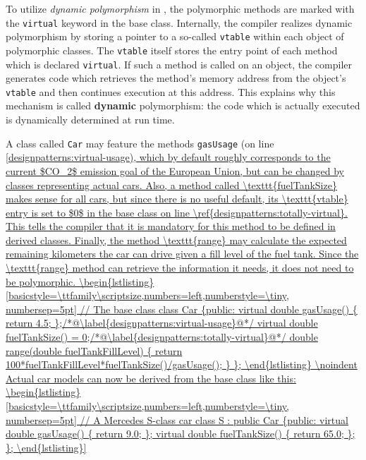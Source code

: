 To utilize \textit{dynamic polymorphism} in \Cplusplus, the polymorphic
methods are marked with the \texttt{virtual} keyword in the base
class. Internally, the compiler realizes dynamic polymorphism by
storing a pointer to a so-called \texttt{vtable} within each object of
polymorphic classes. The \texttt{vtable} itself stores the entry point
of each method which is declared \texttt{virtual}. If such a method is
called on an object, the compiler generates code which retrieves the
method's memory address from the object's \texttt{vtable} and then
continues execution at this address. This explains why this mechanism
is called \textbf{dynamic} polymorphism: the code which is actually
executed is dynamically determined at run time.

\begin{example}
  \label{example:DynPoly}
  A class called \texttt{Car} may feature the methods
  \texttt{gasUsage} (on line \ref{designpatterns:virtual-usage), which
    by default roughly corresponds to the current $CO_2$ emission goal
    of the European Union, but can be changed by classes representing
    actual cars. Also, a method called \texttt{fuelTankSize} makes
    sense for all cars, but since there is no useful default, its
    \texttt{vtable} entry is set to $0$ in the base class on line
    \ref{designpatterns:totally-virtual}. This tells the compiler that
    it is mandatory for this method to be defined in derived
    classes. Finally, the method \texttt{range} may calculate the
    expected remaining kilometers the car can drive given a fill level
    of the fuel tank. Since the \texttt{range} method can retrieve the
    information it needs, it does not need to be polymorphic.
\begin{lstlisting}[basicstyle=\ttfamily\scriptsize,numbers=left,numberstyle=\tiny, numbersep=5pt]
// The base class
class Car
{public:
  virtual double gasUsage() 
  { return 4.5; };/*@\label{designpatterns:virtual-usage}@*/
  virtual double fuelTankSize() = 0;/*@\label{designpatterns:totally-virtual}@*/
  
  double range(double fuelTankFillLevel) 
  { return 100*fuelTankFillLevel*fuelTankSize()/gasUsage(); }
};
\end{lstlisting}

\noindent
Actual car models can now be derived from the base class like this:
\begin{lstlisting}[basicstyle=\ttfamily\scriptsize,numbers=left,numberstyle=\tiny, numbersep=5pt]
// A Mercedes S-class car
class S : public Car
{public:
  virtual double gasUsage() { return 9.0; };
  virtual double fuelTankSize() { return 65.0; };
};


\end{lstlisting}}
\end{example}
